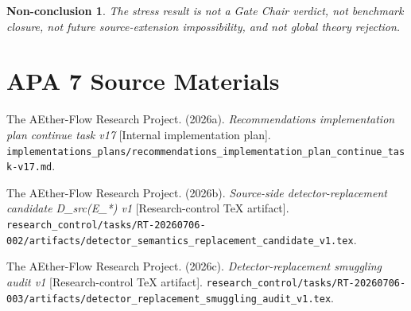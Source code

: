 \documentclass[11pt]{article}
\newtheorem{nonconclusion}{Non-conclusion}
\begin{document}
\begin{nonconclusion}
The stress result is not a Gate Chair verdict, not benchmark closure, not
future source-extension impossibility, and not global theory rejection.
\end{nonconclusion}

\section{APA 7 Source Materials}

The AEther-Flow Research Project. (2026a). \emph{Recommendations
implementation plan continue task v17} [Internal implementation plan].
\texttt{implementations\_plans/recommendations\_implementation\_plan\_continue\_task-v17.md}.

The AEther-Flow Research Project. (2026b). \emph{Source-side
detector-replacement candidate D\_src(E\_*) v1} [Research-control TeX
artifact]. \texttt{research\_control/tasks/RT-20260706-002/artifacts/detector\_semantics\_replacement\_candidate\_v1.tex}.

The AEther-Flow Research Project. (2026c). \emph{Detector-replacement
smuggling audit v1} [Research-control TeX artifact].
\texttt{research\_control/tasks/RT-20260706-003/artifacts/detector\_replacement\_smuggling\_audit\_v1.tex}.
\end{document}
